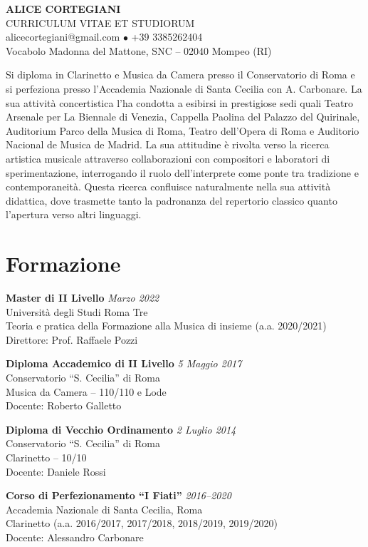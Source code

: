 \documentclass[11pt,a4paper]{article}
\newcommand{\cvitem}[4]{%
    \textbf{#1} \hfill \textit{#2}\\
    #3\\
    #4\vspace{0.3em}
}
\begin{document}
\begin{center}
    {\huge\sffamily\bfseries ALICE CORTEGIANI}\\[0.5em]
    {\large CURRICULUM VITAE ET STUDIORUM}\\[1em]

    alicecortegiani@gmail.com \quad $\bullet$ \quad +39 3385262404\\
    Vocabolo Madonna del Mattone, SNC -- 02040 Mompeo (RI)
\end{center}

\vspace{1em}

Si diploma in Clarinetto e Musica da Camera presso il Conservatorio di Roma e si perfeziona presso l’Accademia Nazionale di Santa Cecilia con A. Carbonare. La sua attività concertistica l’ha condotta a esibirsi in prestigiose sedi quali Teatro Arsenale per La Biennale di Venezia, Cappella Paolina del Palazzo del Quirinale, Auditorium Parco della Musica di Roma, Teatro dell’Opera di Roma e Auditorio Nacional de Musica de Madrid. La sua attitudine è rivolta verso la ricerca artistica musicale attraverso collaborazioni con compositori e laboratori di sperimentazione, interrogando il ruolo dell’interprete come ponte tra tradizione e contemporaneità. Questa ricerca confluisce naturalmente nella sua attività didattica, dove trasmette tanto la padronanza del repertorio classico quanto l’apertura verso altri linguaggi.


\section{Formazione}

\cvitem{Master di II Livello}{Marzo 2022}
{Università degli Studi Roma Tre}
{Teoria e pratica della Formazione alla Musica di insieme (a.a. 2020/2021)\\
Direttore: Prof. Raffaele Pozzi}

\cvitem{Diploma Accademico di II Livello}{5 Maggio 2017}
{Conservatorio ``S. Cecilia'' di Roma}
{Musica da Camera -- 110/110 e Lode\\
Docente: Roberto Galletto}

\cvitem{Diploma di Vecchio Ordinamento}{2 Luglio 2014}
{Conservatorio ``S. Cecilia'' di Roma}
{Clarinetto -- 10/10\\
Docente: Daniele Rossi}

\cvitem{Corso di Perfezionamento ``I Fiati''}{2016--2020}
{Accademia Nazionale di Santa Cecilia, Roma}
{Clarinetto (a.a. 2016/2017, 2017/2018, 2018/2019, 2019/2020)\\
Docente: Alessandro Carbonare}
\end{document}
